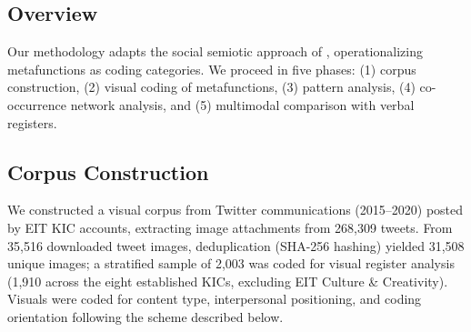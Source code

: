 \documentclass[../main.tex]{subfiles}
\begin{document}
\begin{wideblock}
\label{fig:ch8:workflow}
\end{wideblock}

\subsection{Overview}

Our methodology adapts the social semiotic approach of \textcite{jancsary2018institutions}, operationalizing metafunctions as coding categories. We proceed in five phases: (1) corpus construction, (2) visual coding of metafunctions, (3) pattern analysis, (4) co-occurrence network analysis, and (5) multimodal comparison with verbal registers.

\subsection{Corpus Construction}

We constructed a visual corpus from Twitter communications (2015--2020) posted by EIT KIC accounts, extracting image attachments from 268,309 tweets. From 35,516 downloaded tweet images, deduplication (SHA-256 hashing) yielded 31,508 unique images; a stratified sample of 2,003 was coded for visual register analysis (1,910 across the eight established KICs, excluding EIT Culture \& Creativity). Visuals were coded for content type, interpersonal positioning, and coding orientation following the scheme described below.
\end{document}
